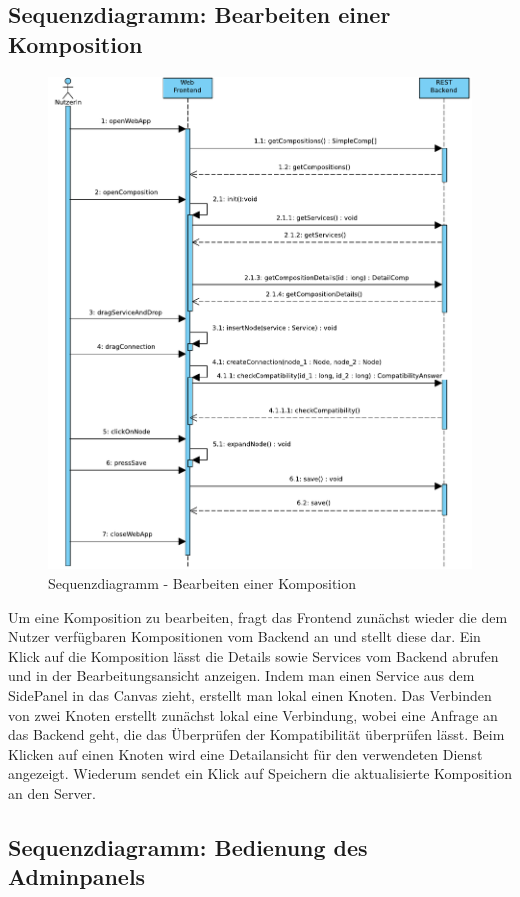 \newpage
\subsection*{Sequenzdiagramm: Bearbeiten einer Komposition}

\begin{figure}[!h]
	\centering
	\includegraphics[width=.5\textwidth]{img/Diagramme/Sequenz/Frontend_editComp}			
	\caption{Sequenzdiagramm - Bearbeiten einer Komposition}
	\label{fig:sequenz-editComp}
\end{figure}
\noindent
Um eine Komposition zu bearbeiten, fragt das Frontend zunächst wieder die dem Nutzer verfügbaren Kompositionen vom Backend an und stellt diese dar. Ein Klick auf die Komposition lässt die Details sowie Services vom Backend abrufen und in der Bearbeitungsansicht anzeigen. Indem man einen Service aus dem SidePanel in das Canvas zieht, erstellt man lokal einen Knoten. Das Verbinden von zwei Knoten erstellt zunächst lokal eine Verbindung, wobei eine Anfrage an das Backend geht, die das Überprüfen der Kompatibilität überprüfen lässt. Beim Klicken auf einen Knoten wird eine Detailansicht für den verwendeten Dienst angezeigt. Wiederum sendet ein Klick auf Speichern die aktualisierte Komposition an den Server.

\newpage
\subsection*{Sequenzdiagramm: Bedienung des Adminpanels}

